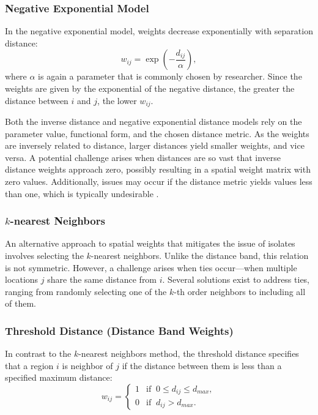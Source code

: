 \documentclass[english,12pt]{book}\usepackage[]{graphicx}\usepackage[]{xcolor}
\begin{document}
\subsubsection{Negative Exponential Model}

In the negative exponential model, weights decrease exponentially with separation distance:
\begin{equation*}
  w_{ij} = \exp\left(-\frac{d_{ij}}{\alpha}\right),
\end{equation*}
%
where $\alpha$ is again a parameter that is commonly chosen by researcher. Since the weights are given by the exponential of the negative distance, the greater the distance between $i$ and $j$, the lower $w_{ij}$.

Both the inverse distance and negative exponential distance models rely on the parameter value, functional form, and the chosen distance metric. As the weights are inversely related to distance, larger distances yield smaller weights, and vice versa. A potential challenge arises when distances are so vast that inverse distance weights approach zero, possibly resulting in a spatial weight matrix with zero values. Additionally, issues may occur if the distance metric yields values less than one, which is typically undesirable \citep{anselin2014modern}. 

\subsubsection{$k$-nearest Neighbors}

An alternative approach to spatial weights that mitigates the issue of isolates involves selecting the $k$-nearest neighbors. Unlike the distance band, this relation is not symmetric. However, a challenge arises when ties occur—when multiple locations $j$ share the same distance from $i$. Several solutions exist to address ties, ranging from randomly selecting one of the $k$-th order neighbors to including all of them.

\subsubsection{Threshold Distance (Distance Band Weights)}

In contrast to the $k$-nearest neighbors method, the threshold distance specifies that a region $i$ is neighbor of $j$ if the distance between them is less than a specified maximum distance:
\begin{equation*}
  w_{ij}= 
   \begin{cases}
      1 & \mbox{if}\;\; 0\leq d_{ij} \leq d_{max}, \\ 
      0 & \mbox{if}\;\; d_{ij} > d_{max}.
   \end{cases}
\end{equation*}
\end{document}
